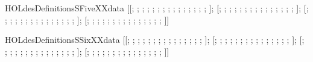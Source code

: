\begin{SaveVerbatim}{HOLdesDefinitionsSFiveXXdata}
\HOLTokenTurnstile{}  \HOLSymConst{=}
   [[; ; ; ; ; ; ; ; ; ; ; ; ; ; ; ];
    [; ; ; ; ; ; ; ; ; ; ; ; ; ; ; ];
    [; ; ; ; ; ; ; ; ; ; ; ; ; ; ; ];
    [; ; ; ; ; ; ; ; ; ; ; ; ; ; ; ]]
\end{SaveVerbatim}
\newcommand{\HOLdesDefinitionsSFiveXXdata}{\UseVerbatim{HOLdesDefinitionsSFiveXXdata}}
\begin{SaveVerbatim}{HOLdesDefinitionsSSixXXdata}
\HOLTokenTurnstile{}  \HOLSymConst{=}
   [[; ; ; ; ; ; ; ; ; ; ; ; ; ; ; ];
    [; ; ; ; ; ; ; ; ; ; ; ; ; ; ; ];
    [; ; ; ; ; ; ; ; ; ; ; ; ; ; ; ];
    [; ; ; ; ; ; ; ; ; ; ; ; ; ; ; ]]
\end{SaveVerbatim}
\newcommand{\HOLdesDefinitionsSSixXXdata}{\UseVerbatim{HOLdesDefinitionsSSixXXdata}}
